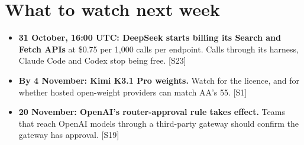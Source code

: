 \documentclass[11pt,a4paper]{article}
\newcommand{\srcref}[1]{\textcolor{brandaccent}{[S#1]}}
\begin{document}
\section{What to watch next week}

\begin{itemize}
  \item \textbf{31 October, 16:00 UTC: DeepSeek starts billing its Search and Fetch APIs} at \$0.75 per 1,000 calls per endpoint. Calls through its harness, Claude Code and Codex
  stop being free. \srcref{23}
  \item \textbf{By 4 November: Kimi K3.1 Pro weights.} Watch for the licence, and for whether hosted open-weight providers can match AA's 55. \srcref{1}
  \item \textbf{20 November: OpenAI's router-approval rule takes effect.} Teams that reach OpenAI models through a third-party gateway should confirm the gateway has approval. \srcref{19}
\end{itemize}

\clearpage
\end{document}
